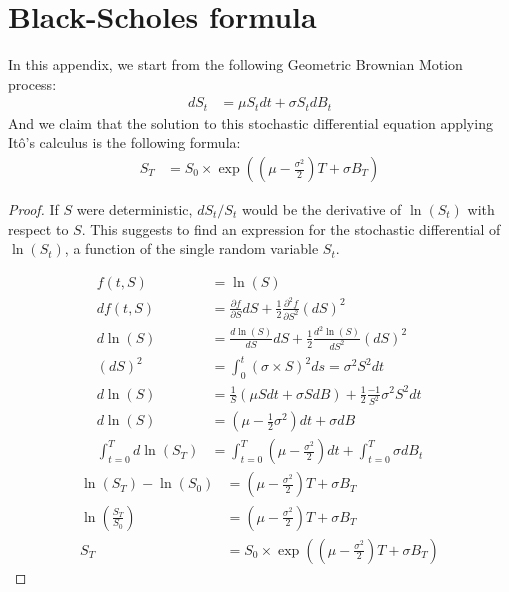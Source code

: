 \documentclass[12pt,twoside]{reedthesis}
\theoremstyle{definition}
\theoremstyle{definition}
\theoremstyle{remark}
\begin{document}
  \appendix
  
  \chapter{Black-Scholes formula}\label{bsformula}
  
  In this appendix, we start from the following Geometric Brownian Motion
  process:
  \begin{align*}
  dS_t &= \mu S_t dt + \sigma S_t dB_t
  \end{align*}
  And we claim that the solution to this stochastic differential equation
  applying Itô's calculus is the following formula:
  \begin{align*}
  S_T &= S_0 \times \exp \left( \left( \mu  - \frac{\sigma^2}{2} \right) T  + \sigma B_T \right)
  \end{align*}
  \begin{proof}
  
  If $S$ were deterministic, $dS_t/S_t$ would be the derivative of $\ln(S_t)$ with respect to $S$. This suggests to find an expression for the stochastic differential of $\ln(S_t)$, a function of the single random variable $S_t$.
  
  
  \begin{align*} 
  f(t,S) &= \ln(S) \\[10pt]
  df(t,S) &= \frac{\partial f}{\partial S} dS + \frac{1}{2} \frac{\partial^2 f}{\partial S^2} (dS)^2 \\[10pt]
  d\ln(S) &= \frac{d\ln(S)}{dS} dS + \frac{1}{2} \frac{d^2\ln(S)}{dS^2}(dS)^2 \\[10pt]
  (dS)^2 &= \int_{0}^{t}{\left(\sigma \times S \right)^2} ds = \sigma^2 S^2 dt \\[10pt]
  d\ln(S) &= \frac{1}{S} (\mu S dt + \sigma S dB) + \frac{1}{2}\frac{-1}{S^2} \sigma^2 S^2 dt \\[10pt]
  d\ln(S) &= \left( \mu -  \frac{1}{2} \sigma^2 \right) dt + \sigma dB \\[10pt]
  \int_{t=0}^{T}{d\ln(S_T)} &= \int_{t=0}^{T}{\left( \mu - \frac{\sigma^2}{2} \right) dt} + \int_{t=0}^{T}{\sigma dB_t} 
  \end{align*}
  \begin{align*} 
  \ln(S_T) - \ln(S_0) &=  \left(\mu  - \frac{\sigma^2}{2} \right)  T + \sigma B_T \\[10pt]
  \ln \left( \frac{S_T}{S_0} \right) &= \left( \mu  - \frac{\sigma^2}{2}  \right) T + \sigma B_T \\[10pt]
  S_T &= S_0 \times \exp \left( \left( \mu  - \frac{\sigma^2}{2} \right) T  + \sigma B_T \right) 
  \end{align*}
  \end{proof}
\end{document}
